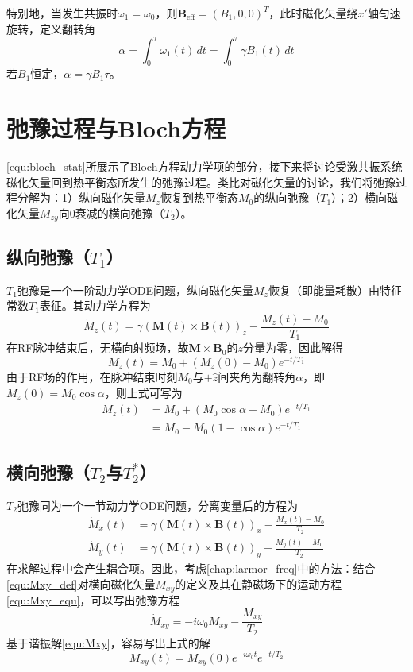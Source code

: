 \documentclass[12pt]{article}
\begin{document}
特别地，当发生共振时$\omega_1=\omega_0$，则$\bm{B}_\mathrm{eff}=(B_1,0,0)^T$，此时磁化矢量绕$x'$轴匀速旋转，定义翻转角
\begin{equation}
    \alpha=\int_{0}^{\tau}\omega_1(t)\,dt=\int_0^{\tau}\gamma B_1(t)\,dt
\end{equation}
若$B_1$恒定，$\alpha=\gamma B_1\tau$。

\section{弛豫过程与Bloch方程}
\autoref{equ:bloch_stat}所展示了Bloch方程动力学项的部分，接下来将讨论受激共振系统磁化矢量回到热平衡态所发生的弛豫过程。类比对磁化矢量的讨论，我们将弛豫过程分解为：1）纵向磁化矢量$M_z$恢复到热平衡态$M_0$的纵向弛豫（$T_1$）；2）横向磁化矢量$M_{zy}$向0衰减的横向弛豫（$T_2$）。

\subsection{纵向弛豫（$T_1$）}
$T_1$弛豫是一个一阶动力学ODE问题，纵向磁化矢量$M_z$恢复（即能量耗散）由特征常数$T_1$表征。其动力学方程为
\begin{equation}
    \dot{M}_z(t)=\gamma\left(\bm{M}(t)\times\bm{B}(t)\right)_z-\frac{M_z(t)-M_0}{T_1}
    \label{equ:Mz_equ}
\end{equation}
在RF脉冲结束后，无横向射频场，故$\bm{M}\times\bm{B}_0$的$z$分量为零，因此解得
\begin{equation}
    M_z(t)=M_0+(M_z(0)-M_0)e^{-t/T_1}
\end{equation}
由于RF场的作用，在脉冲结束时刻$M_0$与$+\hat{z}$间夹角为翻转角$\alpha$，即$M_z(0)=M_0\cos\alpha$，则上式可写为
\begin{equation}
    \begin{aligned}
        M_z(t)&=M_0+(M_0\cos\alpha-M_0)e^{-t/T_1}\\
        &=M_0-M_0(1-\cos\alpha)e^{-t/T_1}
    \end{aligned}
\end{equation}

\subsection{横向弛豫（$T_2$与$T_2^*$）}
$T_2$弛豫同为一个一节动力学ODE问题，分离变量后的方程为
\begin{align}
    \dot{M}_x(t)&=\gamma\left(\bm{M}(t)\times\bm{B}(t)\right)_x-\frac{M_x(t)-M_0}{T_2}\\
    \dot{M}_y(t)&=\gamma\left(\bm{M}(t)\times\bm{B}(t)\right)_y-\frac{M_y(t)-M_0}{T_2}
\end{align}
在求解过程中会产生耦合项。因此，考虑\autoref{chap:larmor_freq}中的方法：结合\autoref{equ:Mxy_def}对横向磁化矢量$M_{xy}$的定义及其在静磁场下的运动方程\autoref{equ:Mxy_equ}，可以写出弛豫方程
\begin{equation}
    \dot{M}_{xy}=-i\omega_0 M_{xy}-\frac{M_{xy}}{T_2}
\end{equation}
基于谐振解\autoref{equ:Mxy}，容易写出上式的解
\begin{equation}
    M_{xy}(t)=M_{xy}(0)e^{-i\omega_0 t}e^{-t/T_2}
\end{equation}
\end{document}
